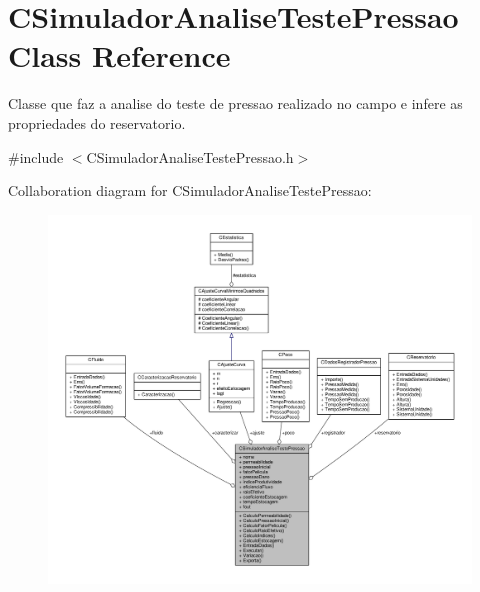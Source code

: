 \hypertarget{classCSimuladorAnaliseTestePressao}{\section{C\-Simulador\-Analise\-Teste\-Pressao Class Reference}
\label{classCSimuladorAnaliseTestePressao}
}


Classe que faz a analise do teste de pressao realizado no campo e infere as propriedades do reservatorio.  




{\ttfamily \#include $<$C\-Simulador\-Analise\-Teste\-Pressao.\-h$>$}



Collaboration diagram for C\-Simulador\-Analise\-Teste\-Pressao\-:
\nopagebreak
\begin{figure}[H]
\begin{center}
\leavevmode
\includegraphics[width=350pt]{classCSimuladorAnaliseTestePressao__coll__graph}
\end{center}
\end{figure}
